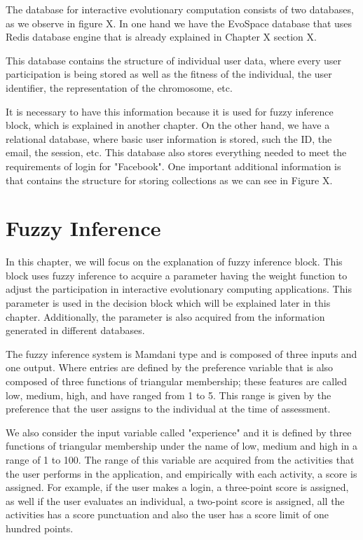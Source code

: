 The database for interactive evolutionary computation consists of two databases, as we observe in figure X. In one hand we have the EvoSpace database that uses Redis database engine that is already explained in Chapter X section X.

This database contains the structure of individual user data, where every user participation is being stored as well as the fitness of the individual, the user identifier, the representation of the chromosome, etc. 

It is necessary to have this information because it is used for fuzzy inference block, which is explained in another chapter. On the other hand, we have a relational database, where basic user information is stored, such the ID, the email, the session, etc. This database also stores everything needed to meet the requirements of login for "Facebook". One important additional information is that contains the structure for storing collections as we can see in Figure X.

\section{Fuzzy Inference}
In this chapter, we will focus on the explanation of fuzzy inference block. This block uses fuzzy inference to acquire a parameter having the weight function to adjust the participation in interactive evolutionary computing applications. This parameter is used in the decision block which will be explained later in this chapter. Additionally, the parameter is also acquired from the information generated in different databases.

The fuzzy inference system is Mamdani type and is composed of three inputs and one output. Where entries are defined by the preference variable that is also composed of three functions of triangular membership; these features are called low, medium, high, and have ranged from 1 to 5. This range is given by the preference that the user assigns to the individual at the time of assessment.

We also consider the input variable called "experience" and it is defined by three functions of triangular membership under the name of low, medium and high in a range of 1 to 100. The range of this variable are acquired from the activities that the user performs in the application, and empirically with each activity, a score is assigned. For example, if the user makes a login, a three-point score is assigned, as well if the user evaluates an individual, a two-point score is assigned, all the activities has a score punctuation and also the user has a score limit of one hundred points.

